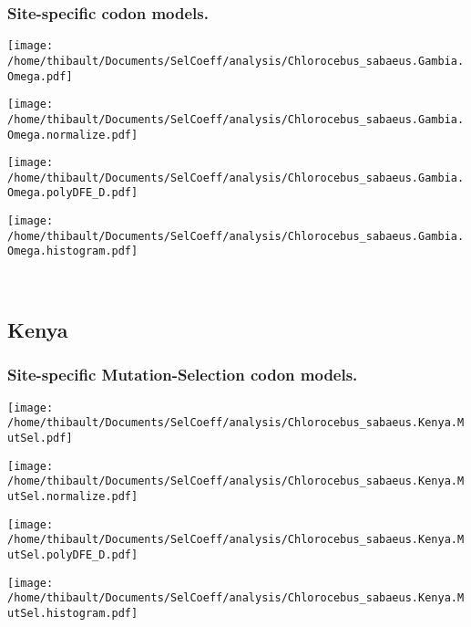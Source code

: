 \subsubsection*{Site-specific codon models.} 
\begin{minipage}{0.49\linewidth} 
\texttt{[image: /home/thibault/Documents/SelCoeff/analysis/Chlorocebus\_sabaeus.Gambia.Omega.pdf]} 
\end{minipage}
\begin{minipage}{0.49\linewidth} 
\texttt{[image: /home/thibault/Documents/SelCoeff/analysis/Chlorocebus\_sabaeus.Gambia.Omega.normalize.pdf]} 
\end{minipage}
\begin{minipage}{0.49\linewidth} 
\texttt{[image: /home/thibault/Documents/SelCoeff/analysis/Chlorocebus\_sabaeus.Gambia.Omega.polyDFE\_D.pdf]} 
\end{minipage}
\begin{minipage}{0.49\linewidth} 
\texttt{[image: /home/thibault/Documents/SelCoeff/analysis/Chlorocebus\_sabaeus.Gambia.Omega.histogram.pdf]} 
\end{minipage}
\\ 
\subsection{Kenya} 
 
\subsubsection*{Site-specific Mutation-Selection codon models.} 
\begin{minipage}{0.49\linewidth} 
\texttt{[image: /home/thibault/Documents/SelCoeff/analysis/Chlorocebus\_sabaeus.Kenya.MutSel.pdf]} 
\end{minipage}
\begin{minipage}{0.49\linewidth} 
\texttt{[image: /home/thibault/Documents/SelCoeff/analysis/Chlorocebus\_sabaeus.Kenya.MutSel.normalize.pdf]} 
\end{minipage}
\begin{minipage}{0.49\linewidth} 
\texttt{[image: /home/thibault/Documents/SelCoeff/analysis/Chlorocebus\_sabaeus.Kenya.MutSel.polyDFE\_D.pdf]} 
\end{minipage}
\begin{minipage}{0.49\linewidth} 
\texttt{[image: /home/thibault/Documents/SelCoeff/analysis/Chlorocebus\_sabaeus.Kenya.MutSel.histogram.pdf]} 
\end{minipage}
\\ 
